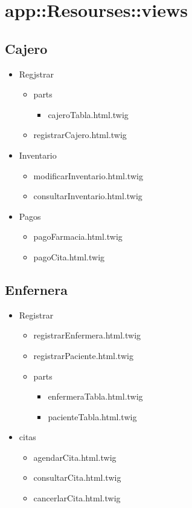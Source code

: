 	
	
	\section{app::Resourses::views}
		\subsection{Cajero}
		\begin{itemize}
			\item Regjstrar
			\begin{itemize}
				\item parts
				\begin{itemize}
					\item cajeroTabla.html.twig
				\end{itemize}
				\item registrarCajero.html.twig
			\end{itemize}
			\item Inventario
			\begin{itemize}
				\item modificarInventario.html.twig
				\item consultarInventario.html.twig
			\end{itemize}
			\item Pagos
			\begin{itemize}
				\item pagoFarmacia.html.twig
				\item pagoCita.html.twig
			\end{itemize}
		\end{itemize}
		
		\subsection{Enfernera}
		\begin{itemize}
		\item Registrar
		\begin{itemize}
		\item registrarEnfermera.html.twig
		\item registrarPaciente.html.twig
		\item parts
			\begin{itemize}
				\item enfermeraTabla.html.twig
				\item pacienteTabla.html.twig
			\end{itemize}
		\end{itemize}
		\item citas 
			\begin{itemize}
				\item agendarCita.html.twig
				\item consultarCita.html.twig
				\item cancerlarCita.html.twig
			\end{itemize}
		\end{itemize}
